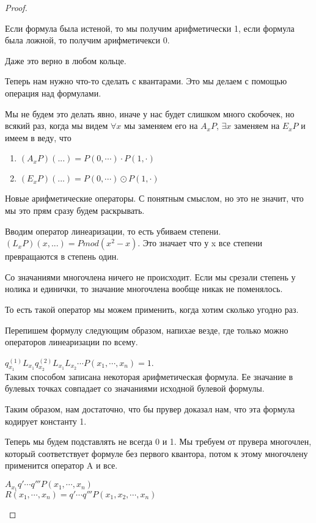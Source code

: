 \begin{proof}
\begin{description}
		Если формула была истеной, то мы получим арифметически 1, если формула была ложной, то получим арифметичекси 0. 

		Даже это верно в любом кольце. 

		Теперь нам нужно что-то	сделать с квантарами. Это мы делаем с помощью операция над формулами.

		Мы не будем это делать явно, иначе у нас будет слишком много скобочек, но всякий раз, когда мы видем $\forall x$ мы заменяем его 
		на $A_xP$, $\exists x$ заменяем на $E_xP$ и имеем в веду, что
		\begin{enumerate}
		\item $(A_xP)(...) = P(0, \cdots) \cdot P(1, \cdot)$\\
		\item $(E_xP)(...) = P(0, \cdots) \odot P(1, \cdot)$\\
		\end{enumerate}

		Новые арифметические операторы. С понятным смыслом, но это не значит, что мы это прям сразу будем раскрывать.
 
		Вводим оператор линеаризации, то есть убиваем степени.   
		$(L_xP)(x, ...) = P mod (x^2 - x)$. Это значает что у x все степени превращаются в степень один.

		Со значаниями многочлена ничего не происходит. Если мы срезали степень у нолика и единички, то значание
		многочлена вообще никак не поменялось.

		То есть такой оператор мы можем применить, когда хотим сколько угодно раз. 

		Перепишем формулу следующим образом, напихае везде, где только можно операторов линеаризации по всему. 
		
		$q_{x_1}^{(1)}L_{x_1}q_{x_2}^{(2)}L_{x_1}L_{x_2} \cdots P(x_1,\cdots, x_n) = 1$.\\

		Таким способом записана некоторая арифметическая формула. 
		Ее значание в булевых точках совпадает со значаниями исходной булевой формулы. 

		Таким образом, нам достаточно, что бы прувер доказал нам, что эта формула кодирует константу 1.

		Теперь мы будем подставлять не всегда 0 и 1. Мы требуем от прувера многочлен, который
		соответствует формуле без первого квантора, потом к этому многочлену применится оператор A и все.

		$A_{x_1}q'\cdots q'''P(x_1, \cdots, x_n)$\\
		$R(x_1, \cdots, x_n) = q'\cdots q'''P(x_1, x_2, \cdots, x_n)$ \\ 


\end{description}
\end{proof}
